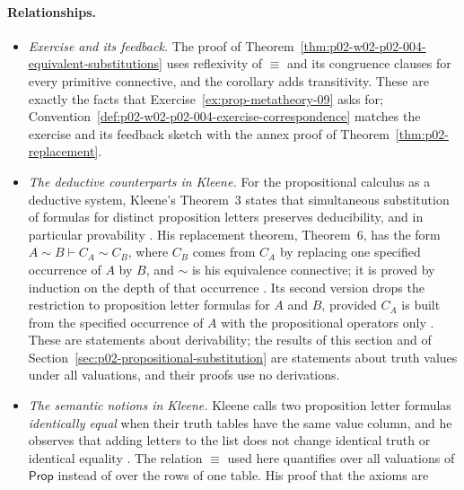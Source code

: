 \paragraph{Relationships.}
\begin{itemize}
  \item \emph{Exercise and its feedback.}  The proof of
        Theorem~\ref{thm:p02-w02-p02-004-equivalent-substitutions} uses
        reflexivity of \(\equiv\) and its congruence clauses for every
        primitive connective, and the corollary adds transitivity.  These are
        exactly the facts that Exercise~\ref{ex:prop-metatheory-09} asks for;
        Convention~\ref{def:p02-w02-p02-004-exercise-correspondence} matches
        the exercise and its feedback sketch with the annex proof of
        Theorem~\ref{thm:p02-replacement}.
  \item \emph{The deductive counterparts in Kleene.}  For the propositional
        calculus as a deductive system, Kleene's Theorem~3 states that
        simultaneous substitution of formulas for distinct proposition
        letters preserves deducibility, and in particular provability
        \cite[\S 25, Theorem~3, p.~109]{Kleene1952}.  His replacement
        theorem, Theorem~6, has the form
        \(A\sim B\vdash C_A\sim C_B\), where \(C_B\) comes from \(C_A\) by
        replacing one specified occurrence of \(A\) by \(B\), and \(\sim\) is
        his equivalence connective; it is proved by induction on the depth of
        that occurrence \cite[\S 26, Theorem~6, p.~116]{Kleene1952}.  Its
        second version drops the restriction to proposition letter formulas
        for \(A\) and \(B\), provided \(C_A\) is built from the specified
        occurrence of \(A\) with the propositional operators only
        \cite[\S 26, p.~117]{Kleene1952}.  These are
        statements about derivability; the results of this section and of
        Section~\ref{sec:p02-propositional-substitution} are statements about
        truth values under all valuations, and their proofs use no
        derivations.
  \item \emph{The semantic notions in Kleene.}  Kleene calls two proposition
        letter formulas \emph{identically equal} when their truth tables have
        the same value column, and he observes that adding letters to the
        list does not change identical truth or identical equality
        \cite[\S 28, pp.~127--128]{Kleene1952}.  The relation \(\equiv\)
        used here quantifies over all valuations of \(\mathsf{Prop}\)
        instead of over the rows of one table.  His proof that the axioms are

\end{itemize}
